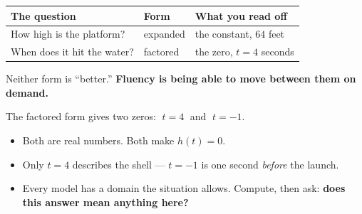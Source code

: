 \documentclass[aspectratio=169, 11pt]{beamer}
\begin{document}
\begin{frame}[t, plain]
  \renewcommand{\arraystretch}{1.5}
  \begin{tabularx}{\textwidth}{@{}p{4.6cm} p{2.6cm} X@{}}
    \textbf{The question} & \textbf{Form} & \textbf{What you read off} \\
    \hline
    How high is the platform? & expanded & the constant, $64$ feet \\
    When does it hit the water? & factored & the zero, $t=4$ seconds \\
  \end{tabularx}
  \vspace{0.5cm}

  Neither form is ``better.'' \textbf{Fluency is being able to move between them on demand.}
\end{frame}

\begin{frame}[t, plain]
  The factored form gives two zeros: $\;t=4\;$ and $\;t=-1$.
  \vspace{0.3cm}
  \begin{itemize}
    \setlength{\itemsep}{0.35cm}
    \item Both are real numbers. Both make $h(t)=0$.
    \item Only $t=4$ describes the shell --- $t=-1$ is one second \emph{before} the launch.
    \item Every model has a domain the situation allows. Compute, then ask:
          \textbf{does this answer mean anything here?}
  \end{itemize}
\end{frame}
\end{document}
